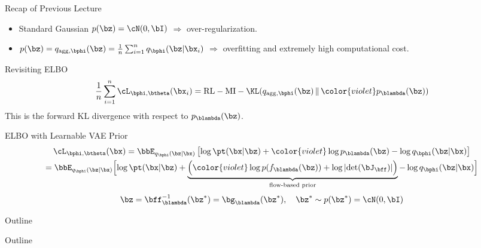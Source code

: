 \documentclass{beamer}
\begin{document}
\begin{frame}{Recap of Previous Lecture}
	\begin{itemize}
		\item Standard Gaussian $p(\bz) = \cN(0, \bI)$ $\Rightarrow$ over-regularization.
		\item $p(\bz) = q_{\text{agg}, \bphi}(\bz) = \frac{1}{n}\sum_{i=1}^n q_{\bphi}(\bz| \bx_i)$ $\Rightarrow$ overfitting and extremely high computational cost.
	\end{itemize}
	\begin{block}{Revisiting ELBO}
		\vspace{-0.4cm}
		\[
		\frac{1}{n}\sum_{i=1}^n \cL_{\bphi, \btheta}(\bx_i) = \text{RL} - \text{MI} -  \KL(q_{\text{agg}, \bphi}(\bz) \,\|\, {\color{violet}p_{\blambda}(\bz)})
		\]
		This is the forward KL divergence with respect to $p_{\blambda}(\bz)$.
	\end{block}
	\begin{block}{ELBO with Learnable VAE Prior}
		\vspace{-0.6cm}
		{\small
			\begin{multline*}
				\cL_{\bphi, \btheta}(\bx) = \bbE_{q_{\bphi}(\bz| \bx)} \left[ \log \pt(\bx | \bz) + {\color{violet}\log p_{\blambda}(\bz)} - \log q_{\bphi}(\bz| \bx) \right] \\
				= \bbE_{q_{\bphi}(\bz| \bx)} \Bigl[ \log \pt(\bx | \bz) + \underbrace{ \Bigl({\color{violet} \log p(f_{\blambda}(\bz)) + \log \left| \det (\bJ_\bff) \right|} \Bigr) }_{\text{flow-based prior}} - \log q_{\bphi}(\bz| \bx) \Bigr] 
			\end{multline*}
		}
		\vspace{-0.5cm}
		\[
			\bz = \bff^{-1}_{\blambda}(\bz^*) = \bg_{\blambda}(\bz^*), \quad \bz^* \sim p(\bz^*) = \cN(0, \bI)
		\]
	\end{block}
	\vspace{-0.5cm}
\end{frame}
\begin{frame}{Outline}
	\tableofcontents
\end{frame}
\begin{frame}{Outline}
	\tableofcontents
\end{frame}
\end{document}

